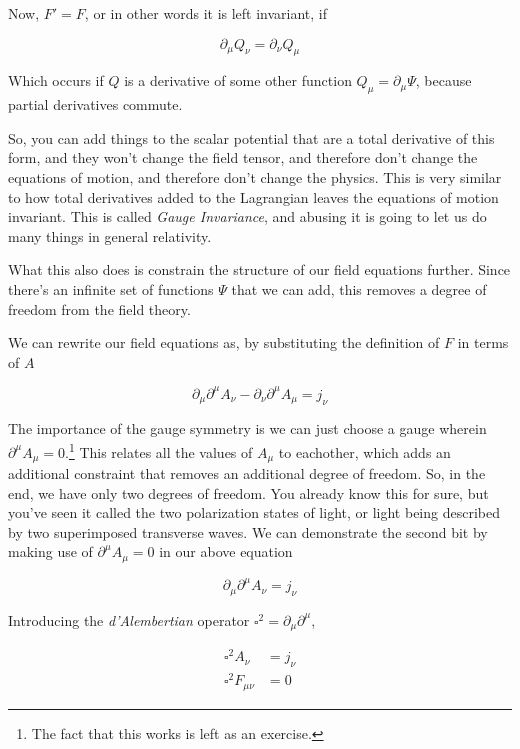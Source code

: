 \documentclass{article}
\begin{document}
Now, $F'=F$, or in other words it is left invariant, if 

\begin{equation}
    \partial_\mu Q_\nu = \partial_\nu Q_\mu
\end{equation}

Which occurs if $Q$ is a derivative of some other function $Q_\mu = \partial_\mu \Psi$, because partial derivatives commute.

So, you can add things to the scalar potential that are a total derivative of this form, and they won't change the field tensor, and therefore don't change the equations of motion, and therefore don't change the physics. This is very similar to how total derivatives added to the Lagrangian leaves the equations of motion invariant. This is called \textit{Gauge Invariance}, and abusing it is going to let us do many things in general relativity.

What this also does is constrain the structure of our field equations further. Since there's an infinite set of functions $\Psi$ that we can add, this removes a degree of freedom from the field theory.

We can rewrite our field equations as, by substituting the definition of $F$ in terms of $A$

\begin{equation}
    \partial_\mu \partial^\mu A_\nu - \partial_\nu \partial^\mu A_\mu = j_\nu
\end{equation}

The importance of the gauge symmetry is we can just choose a gauge wherein $\partial^\mu A_\mu = 0$.\footnote{The fact that this works is left as an exercise.} This relates all the values of $A_\mu$ to eachother, which adds an additional constraint that removes an additional degree of freedom. So, in the end, we have only two degrees of freedom. You already know this for sure, but you've seen it called the two polarization states of light, or light being described by two superimposed transverse waves. We can demonstrate the second bit by making use of $\partial^\mu A_\mu = 0$ in our above equation

\begin{equation}
    \partial_\mu \partial^\mu A_\nu = j_\nu
\end{equation}

Introducing the \textit{d'Alembertian} operator $\square^2 = \partial_\mu \partial^\mu$,

\begin{align}
    \square^2 A_\nu &= j_\nu \\
    \square^2 F_{\mu\nu} &= 0
\end{align}
\end{document}
